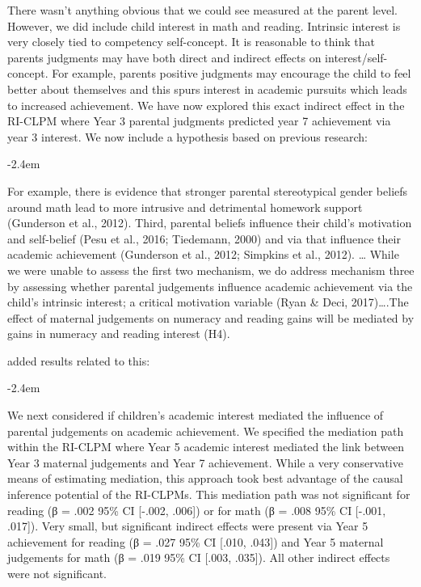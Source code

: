 \documentclass[]{article}
\renewenvironment{quote}{\begin{fquote}\advance\leftmargini -2.4em\begin{oldquote}}{\end{oldquote}\end{fquote}}
\newenvironment{fquote}
  {\def\FrameCommand{
	\fboxsep=0.6em %
	\fcolorbox{black}{white}}%
    \MakeFramed {\advance\hsize-2\width \FrameRestore}
    \begin{minipage}{\linewidth}
  }
  {\end{minipage}\endMakeFramed}
\begin{document}

There wasn't anything obvious that we could see measured at the parent level. However, we did include child interest in math and reading. Intrinsic interest is very closely tied to competency self-concept. It is reasonable to think that parents judgments may have both direct and indirect effects on interest/self-concept. For example, parents positive judgments may encourage the child to feel better about themselves and this spurs interest in academic pursuits which leads to increased achievement. We have now explored this exact indirect effect in the RI-CLPM where Year 3 parental judgments predicted year 7 achievement via year 3 interest. We now include a hypothesis based on previous research:

\begin{quote}
For example, there is evidence that stronger parental stereotypical gender beliefs around math lead to more intrusive and detrimental homework support (Gunderson et al., 2012). Third, parental beliefs influence their child's motivation and self-belief (Pesu et al., 2016; Tiedemann, 2000) and via that influence their academic achievement (Gunderson et al., 2012; Simpkins et al., 2012). \ldots{} While we were unable to assess the first two mechanism, we do address mechanism three by assessing whether parental judgements influence academic achievement via the child's intrinsic interest; a critical motivation variable (Ryan \& Deci, 2017)\ldots.The effect of maternal judgements on numeracy and reading gains will be mediated by gains in numeracy and reading interest (H4).
\end{quote}

added results related to this:

\begin{quote}
We next considered if children's academic interest mediated the influence of parental judgements on academic achievement. We specified the mediation path within the RI-CLPM where Year 5 academic interest mediated the link between Year 3 maternal judgements and Year 7 achievement. While a very conservative means of estimating mediation, this approach took best advantage of the causal inference potential of the RI-CLPMs. This mediation path was not significant for reading (β = .002 95\% CI {[}-.002, .006{]}) or for math (β = .008 95\% CI {[}-.001, .017{]}). Very small, but significant indirect effects were present via Year 5 achievement for reading (β = .027 95\% CI {[}.010, .043{]}) and Year 5 maternal judgements for math (β = .019 95\% CI {[}.003, .035{]}). All other indirect effects were not significant.
\end{quote}
\end{document}
